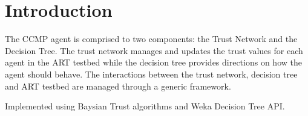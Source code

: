 \documentclass[letterpaper,10pt]{article}
\numberwithin{equation}{section}
\begin{document}
\section{Introduction}
The CCMP agent is comprised to two components: the Trust Network and the
Decision Tree. The trust network manages and updates the trust values for each
agent in the ART testbed while the decision tree provides directions on how the
agent should behave.  The interactions between the trust network, decision tree
and ART testbed are managed through a generic framework.

Implemented using Baysian Trust algorithms and Weka Decision Tree API.








\end{document}
